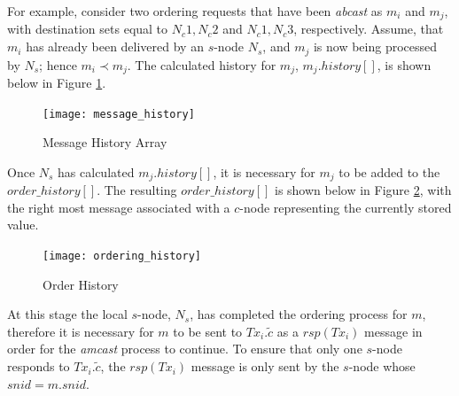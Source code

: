 \begin{enumerate}
        For example, consider two ordering requests that have been \emph{abcast} as $m_i$ and $m_j$, with destination sets equal to ${N_c1, N_c2}$ and ${N_c1, N_c3}$, respectively.  Assume, that $m_i$ has already been delivered by an $s$-node $N_s$, and $m_j$ is now being processed by $N_s$; hence $m_i \prec m_j$.  The calculated history for $m_j$, $m_j.history[]$, is shown below in Figure \ref{fig:message_history}.
        
    \begin{figure}[htbp!] 
        \centering    
         \texttt{[image: message\_history]}
         \caption[Message History Array]{Message History Array}
         \label{fig:message_history}
    \end{figure}            
        
        Once $N_s$ has calculated $m_j.history[]$, it is necessary for $m_j$ to be added to the $order\_history[]$.  The resulting $order\_history[]$ is shown below in Figure \ref{fig:ordering_history}, with the right most message associated with a $c$-node representing the currently stored value.  
		
        \begin{figure}[htbp!] 
        \centering    
         \texttt{[image: ordering\_history]}
         \caption[Order History]{Order History}
         \label{fig:ordering_history}
    \end{figure}            
        
		
        At this stage the local $s$-node, $N_s$, has completed the ordering process for $m$, therefore it is necessary for $m$ to be sent to $Tx_i.\tilde{c}$ as a $rsp(Tx_i)$ message in order for the \emph{amcast} process to continue.  To ensure that only one $s$-node responds to $Tx_i.\tilde{c}$, the $rsp(Tx_i)$ message is only sent by the $s$-node whose $snid = m.snid$.  
        

\end{enumerate}
